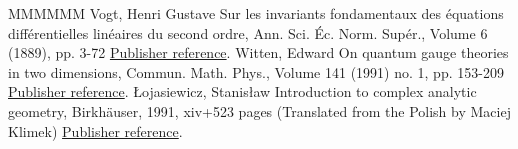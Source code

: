 \documentclass[11pt]{article}
\theoremstyle{definition}
\numberwithin{equation}{section}
\numberwithin{figure}{section}
\numberwithin{table}{section}
\begin{document}
\begin{thebibliography}{MMMMMM}
 Vogt, Henri Gustave Sur les invariants fondamentaux des équations différentielles linéaires du second ordre, Ann. Sci. Éc. Norm. Supér., Volume 6 (1889), pp. 3-72 \href{https://ahl.centre-mersenne.org/item/AHL_2020__3__341_0/#Vogt}{Publisher reference}.
 Witten, Edward On quantum gauge theories in two dimensions, Commun. Math. Phys., Volume 141 (1991) no. 1, pp. 153-209 \href{https://ahl.centre-mersenne.org/item/AHL_2020__3__341_0/#Witten}{Publisher reference}.
 Łojasiewicz, Stanisław Introduction to complex analytic geometry, Birkhäuser, 1991, xiv+523 pages (Translated from the Polish by Maciej Klimek) \href{https://ahl.centre-mersenne.org/item/AHL_2020__3__341_0/#Loj}{Publisher reference}.
\end{thebibliography}
\end{document}
